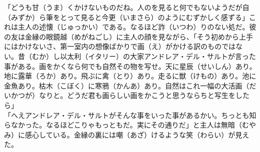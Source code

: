 \documentclass{book}
\begin{document}
「どうも甘（うま）くかけないものだね。人のを見ると何でもないようだが自（みずか）ら筆をとって見ると今更（いまさら）のようにむずかしく感ずる」これは主人の述懐（じゅっかい）である。なるほど詐（いつわ）りのない処だ。彼の友は金縁の眼鏡越（めがねごし）に主人の顔を見ながら、「そう初めから上手にはかけないさ、第一室内の想像ばかりで画（え）がかける訳のものではない。昔（むか）し以太利（イタリー）の大家アンドレア・デル・サルトが言った事がある。画をかくなら何でも自然その物を写せ。天に星辰（せいしん）あり。地に露華（ろか）あり。飛ぶに禽（とり）あり。走るに獣（けもの）あり。池に金魚あり。枯木（こぼく）に寒鴉（かんあ）あり。自然はこれ一幅の大活画（だいかつが）なりと。どうだ君も画らしい画をかこうと思うならちと写生をしたら」\\
「へえアンドレア・デル・サルトがそんな事をいった事があるかい。ちっとも知らなかった。なるほどこりゃもっともだ。実にその通りだ」と主人は無暗（むやみ）に感心している。金縁の裏には嘲（あざ）けるような笑（わらい）が見えた。\\
\end{document}
